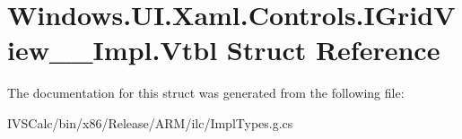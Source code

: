 \hypertarget{struct_windows_1_1_u_i_1_1_xaml_1_1_controls_1_1_i_grid_view_____impl_1_1_vtbl}{}\section{Windows.\+U\+I.\+Xaml.\+Controls.\+I\+Grid\+View\+\_\+\+\_\+\+Impl.\+Vtbl Struct Reference}
\label{struct_windows_1_1_u_i_1_1_xaml_1_1_controls_1_1_i_grid_view_____impl_1_1_vtbl}


The documentation for this struct was generated from the following file\+:\begin{DoxyCompactItemize}
\item 
I\+V\+S\+Calc/bin/x86/\+Release/\+A\+R\+M/ilc/Impl\+Types.\+g.\+cs\end{DoxyCompactItemize}
